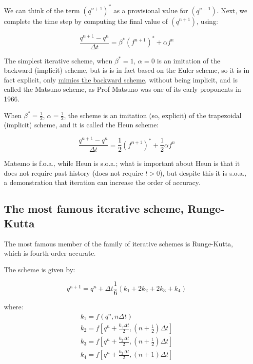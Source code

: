 We can think of the term $(q^{n+1})^*$ as a provisional value for $(q^{n+1})$.
Next, we complete the time step by computing the final value of $(q^{n+1})$, using:
	
\begin{equation}
	\frac{q^{n+1}-q^{n}}{\Delta t} = \beta^* \left(f^{n+1}\right)^* + \alpha f^n
	\label{corrector-Implicit}
\end{equation}
	
The simplest iterative scheme, when $\beta^*=1$, $\alpha=0$ is an imitation of the backward (implicit) scheme, but is is in fact based on the Euler scheme, so it is in fact explicit, only \underline{mimics the backward scheme}, without being implicit, and is called the Matsuno scheme, as Prof Matsuno was one of its early proponents in 1966. 

When $\beta^*=\frac{1}{2}$, $\alpha=\frac{1}{2}$, the scheme is an imitation (so, explicit) of the trapezoidal (implicit) scheme, and it is called the Heun scheme:

\begin{equation}
	\frac{q^{n+1}-q^{n}}{\Delta t} = \frac{1}{2} \left(f^{n+1}\right)^* + \frac{1}{2} \alpha f^n
	\label{Heun}
\end{equation}

Matsuno is f.o.a., while Heun is s.o.a.; what is important about Heun is that it does not require past history (does not require $l>0$), but despite this it is s.o.a., a demonstration that iteration can increase the order of accuracy.

\subsection{The most famous iterative scheme, Runge-Kutta}
The most famous member of the family of iterative schemes is Runge-Kutta, which is fourth-order accurate.

The scheme is given by:

\begin{equation}
	q^{n+1} = q^n + {\Delta t} \frac{1}{6} \left( k_1 + 2 k_2 + 2 k_3 + k_4 \right)
	\label{Runge-Kutta}
\end{equation}

where:
\begin{eqnarray*}
	k_1 = f \left( q^n, n \Delta t\right)\\
	k_2 =  f \left[ q^n +\frac{k_1 \Delta t }{2} , \left( n + \frac{1}{2}  \right) \Delta t \right]\\
	k_3 = f \left[ q^n +\frac{k_2 \Delta t }{2} , \left( n + \frac{1}{2}  \right) \Delta t \right]\\
	k_4 = f \left[ q^n +\frac{k_3 \Delta t }{2} , \left( n + 1  \right) \Delta t \right]
	\label{Runge-Kutta-ks}
\end{eqnarray*}

